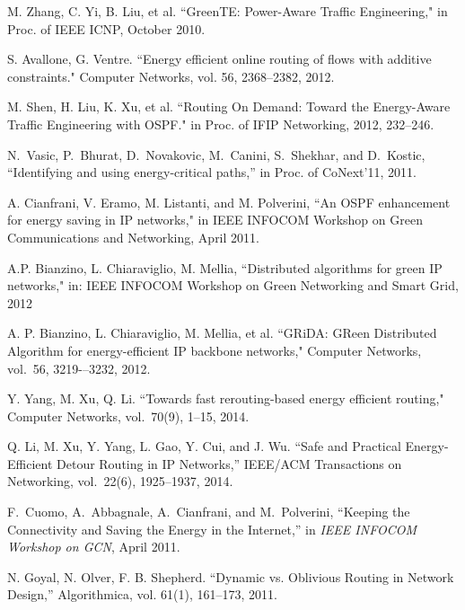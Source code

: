 \documentclass[conference]{IEEEtran}
\begin{document}
\begin{thebibliography}{1}

M. Zhang, C. Yi, B. Liu, et al. ``GreenTE: Power-Aware Traffic Engineering," in Proc. of IEEE ICNP, October 2010.

S. Avallone, G. Ventre. ``Energy efficient online routing of flows with additive constraints." Computer Networks, vol. 56, 2368--2382, 2012.

M. Shen, H. Liu, K. Xu, et al. ``Routing On Demand: Toward the Energy-Aware Traffic Engineering with OSPF." in Proc. of IFIP Networking, 2012, 232--246.

 N.~Vasic, P.~Bhurat, D.~Novakovic,
    M.~Canini, S.~Shekhar, and D.~Kostic,
  ``{I}dentifying and using energy-critical paths,'' in Proc. of CoNext'11, 2011.

A. Cianfrani, V. Eramo, M. Listanti, and M. Polverini, ``An OSPF enhancement for energy saving in IP networks," in IEEE INFOCOM Workshop on Green Communications and Networking, April 2011.

A.P. Bianzino, L. Chiaraviglio, M. Mellia, ``Distributed algorithms for green IP networks," in: IEEE INFOCOM Workshop on Green Networking and Smart Grid, 2012

A. P. Bianzino, L. Chiaraviglio, M. Mellia, et al. ``GRiDA: GReen Distributed Algorithm for energy-efficient IP backbone networks," Computer Networks, vol.~56, 3219-–3232, 2012.

Y. Yang, M. Xu, Q. Li. ``Towards fast rerouting-based energy efficient routing," Computer Networks, vol.~70(9), 1--15, 2014.

Q. Li, M. Xu, Y. Yang, L. Gao, Y. Cui, and J. Wu. ``Safe and Practical Energy-Efficient Detour Routing in IP Networks,'' IEEE/ACM Transactions on Networking, vol.~22(6), 1925--1937, 2014.

 F.~Cuomo, A.~Abbagnale,
    A.~Cianfrani, and M.~Polverini, ``{K}eeping the
  {C}onnectivity and {S}aving the {E}nergy in the {I}nternet,'' in \emph{IEEE INFOCOM Workshop on GCN}, April 2011.
  
N. Goyal, N. Olver, F. B. Shepherd. ``Dynamic vs. Oblivious Routing in Network Design,'' Algorithmica, vol. 61(1), 161--173, 2011.


\end{thebibliography}
\end{document}
